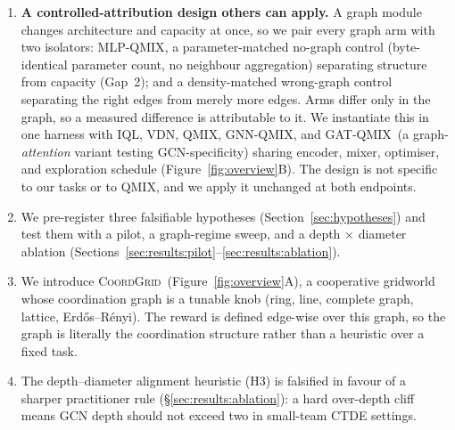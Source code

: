 \documentclass[10pt]{article}
\newcommand{\algoname}[1]{\textsc{#1}}
\newcommand{\iql}{\algoname{IQL}}
\newcommand{\vdn}{\algoname{VDN}}
\newcommand{\qmix}{\algoname{QMIX}}
\newcommand{\gnnqmix}{\algoname{GNN-QMIX}}
\newcommand{\coordgrid}{\textsc{CoordGrid}}
\newcommand{\mlpqmix}{\algoname{MLP-QMIX}}
\newcommand{\gatqmix}{\algoname{GAT-QMIX}}
\newcommand{\PEseeds}{10}             %
\begin{document}
\begin{enumerate}[leftmargin=*,itemsep=0pt,topsep=2pt]
        passing is at best redundant; the non-trivial finding is the
        capacity-matched \emph{identification} of the cause
        (\S\ref{sec:results:capacity}: the no-graph \mlpqmix\ matches \qmix\
        while \gnnqmix\ falls far below both). The unstabilised-graph deficit
        survives a
        $5\times$ longer training budget at $n{=}\PEseeds$ seeds, grows
        monotonically with team size out to $N{=}16$ (distinct from the
        positive structure effect of contribution~1, which is significant at
        every $N$ but non-monotone), reappears under the capacity
        decomposition on MPE \texttt{simple\_spread} (where the naive
        \gnnqmix-vs-\qmix\ comparison is null; \S\ref{sec:results:mpe}), and
        persists under graph attention---but stabilising the GCN recovers it
        to parity with the controls (Appendix~\ref{app:repaired}), so what
        survives for the stabilised operator is the weaker, robust
        \emph{no-benefit} claim.
  \item \textbf{A controlled-attribution design others can apply.} A graph
        module changes architecture and capacity at once, so we pair every
        graph arm with two isolators: \mlpqmix, a parameter-matched no-graph
        control (byte-identical parameter count, no neighbour aggregation)
        separating structure from capacity (Gap~2); and a density-matched
        wrong-graph control separating the right edges from merely more
        edges. Arms differ only in the graph, so a measured difference is
        attributable to it. We instantiate this in one harness with \iql,
        \vdn, \qmix, \gnnqmix, and \gatqmix\ (a graph-\emph{attention} variant
        testing GCN-specificity) sharing encoder, mixer, optimiser, and
        exploration schedule (Figure~\ref{fig:overview}B). The design is not
        specific to our tasks or to \qmix, and we apply it unchanged at both
        endpoints.
  \item We pre-register three falsifiable hypotheses
        (Section~\ref{sec:hypotheses}) and test them with a pilot,
        a graph-regime sweep, and a depth $\times$ diameter ablation
        (Sections~\ref{sec:results:pilot}--\ref{sec:results:ablation}).
  \item We introduce \coordgrid\ (Figure~\ref{fig:overview}A), a cooperative
        gridworld whose coordination graph is a tunable knob (ring, line,
        complete graph, lattice, Erd\H{o}s--R\'enyi). The reward is defined
        edge-wise over this graph, so the graph is literally the
        coordination structure rather than a heuristic over a fixed task.
  \item The depth--diameter alignment heuristic (H3) is falsified in favour
        of a sharper practitioner rule (\S\ref{sec:results:ablation}): a
        hard over-depth cliff means GCN depth should not exceed two in
        small-team CTDE settings.
\end{enumerate}
\end{document}
